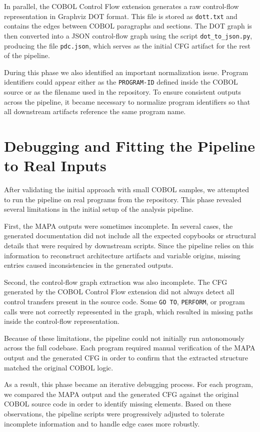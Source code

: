 \documentclass[11pt]{article}
\begin{document}
In parallel, the COBOL Control Flow extension generates a raw control-flow representation in Graphviz DOT format. This file is stored as \texttt{dott.txt} and contains the edges between COBOL paragraphs and sections. The DOT graph is then converted into a JSON control-flow graph using the script \texttt{dot\_to\_json.py}, producing the file \texttt{pdc.json}, which serves as the initial CFG artifact for the rest of the pipeline.

During this phase we also identified an important normalization issue. Program identifiers could appear either as the \texttt{PROGRAM-ID} defined inside the COBOL source or as the filename used in the repository. To ensure consistent outputs across the pipeline, it became necessary to normalize program identifiers so that all downstream artifacts reference the same program name.


\section{Debugging and Fitting the Pipeline to Real Inputs}
\label{sec:debug}

After validating the initial approach with small COBOL samples, we attempted to run the pipeline on real programs from the repository. This phase revealed several limitations in the initial setup of the analysis pipeline.

First, the MAPA outputs were sometimes incomplete. In several cases, the generated documentation did not include all the expected copybooks or structural details that were required by downstream scripts. Since the pipeline relies on this information to reconstruct architecture artifacts and variable origins, missing entries caused inconsistencies in the generated outputs.

Second, the control-flow graph extraction was also incomplete. The CFG generated by the COBOL Control Flow extension did not always detect all control transfers present in the source code. Some \texttt{GO TO}, \texttt{PERFORM}, or program calls were not correctly represented in the graph, which resulted in missing paths inside the control-flow representation.

Because of these limitations, the pipeline could not initially run autonomously across the full codebase. Each program required manual verification of the MAPA output and the generated CFG in order to confirm that the extracted structure matched the original COBOL logic.

As a result, this phase became an iterative debugging process. For each program, we compared the MAPA output and the generated CFG against the original COBOL source code in order to identify missing elements. Based on these observations, the pipeline scripts were progressively adjusted to tolerate incomplete information and to handle edge cases more robustly.
\end{document}
